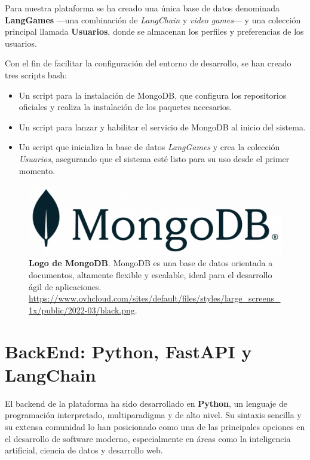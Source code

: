 Para nuestra plataforma se ha creado una única base de datos denominada \textbf{LangGames} —una combinación de \textit{LangChain} y \textit{video games}— y una colección principal llamada \textbf{Usuarios}, donde se almacenan los perfiles y preferencias de los usuarios.

Con el fin de facilitar la configuración del entorno de desarrollo, se han creado tres scripts bash:

\begin{itemize}
	\item Un script para la instalación de MongoDB, que configura los repositorios oficiales y realiza la instalación de los paquetes necesarios.
	\item Un script para lanzar y habilitar el servicio de MongoDB al inicio del sistema.
	\item Un script que inicializa la base de datos \textit{LangGames} y crea la colección \textit{Usuarios}, asegurando que el sistema esté listo para su uso desde el primer momento.
\end{itemize}

\begin{figure}[H]
	\centering
	\includegraphics[width=1\linewidth]{imagenes/mongoDBLogo.png}
	\caption[\textbf{Logo de MongoDB}.]{\textbf{Logo de MongoDB}. MongoDB es una base de datos orientada a documentos, altamente flexible y escalable, ideal para el desarrollo ágil de aplicaciones. \href{https://www.ovhcloud.com/sites/default/files/styles/large_screens_1x/public/2022-03/black.png}{https://www.ovhcloud.com/sites/default/files/styles/large\_screens\_1x/public/2022-03/black.png}.}
	\label{fig:mongodb-logo}
\end{figure}


\newpage

\section{BackEnd: Python, FastAPI y LangChain}

El backend de la plataforma ha sido desarrollado en \textbf{Python}, un lenguaje de programación interpretado, multiparadigma y de alto nivel. Su sintaxis sencilla y su extensa comunidad lo han posicionado como una de las principales opciones en el desarrollo de software moderno, especialmente en áreas como la inteligencia artificial, ciencia de datos y desarrollo web.

